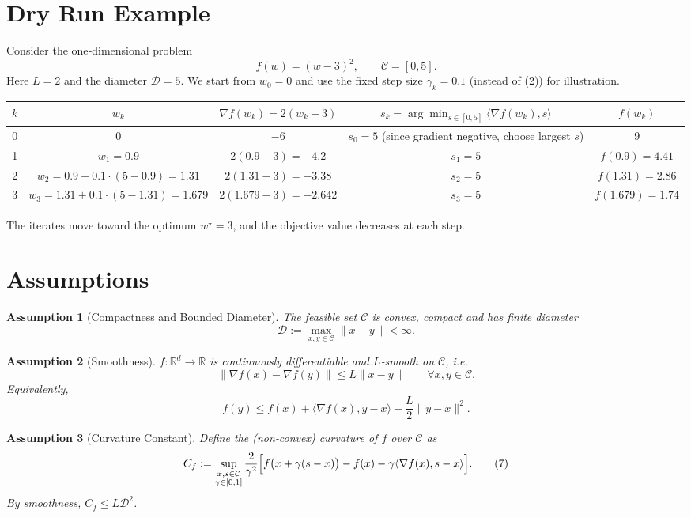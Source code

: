 \documentclass{article}
\newtheorem{assumption}{Assumption}
\newcommand{\diam}{\mathcal{D}}
\newcommand{\curv}{C_f}
\begin{document}
\section*{Dry Run Example}
Consider the one‑dimensional problem
\[
f(w) = (w-3)^2 ,\qquad \mathcal C = [0,5].
\]
Here $L=2$ and the diameter $\diam =5$.  
We start from $w_0=0$ and use the fixed step size $\gamma_k=0.1$ (instead of (2))
for illustration.

\begin{center}
\begin{tabular}{c|c|c|c|c}
$k$ & $w_k$ & $\nabla f(w_k)=2(w_k-3)$ & $s_k=\arg\min_{s\in[0,5]}\langle\nabla f(w_k),s\rangle$ & $f(w_k)$\\\hline
0 & $0$ & $-6$ & $s_0=5$ (since gradient negative, choose largest $s$) & $9$\\
1 & $w_1=0.9$ & $2(0.9-3)=-4.2$ & $s_1=5$ & $f(0.9)=4.41$\\
2 & $w_2=0.9+0.1\cdot(5-0.9)=1.31$ & $2(1.31-3)=-3.38$ & $s_2=5$ & $f(1.31)=2.86$\\
3 & $w_3=1.31+0.1\cdot(5-1.31)=1.679$ & $2(1.679-3)=-2.642$ & $s_3=5$ & $f(1.679)=1.74$
\end{tabular}
\end{center}
The iterates move toward the optimum $w^\star=3$, and the objective value
decreases at each step.

\section*{Assumptions}
\begin{assumption}[Compactness and Bounded Diameter]\label{as:diam}
The feasible set $\mathcal C$ is convex, compact and has finite diameter
\[
\diam := \max_{x,y\in\mathcal C}\|x-y\| < \infty .
\]
\end{assumption}

\begin{assumption}[Smoothness]\label{as:smooth}
$f:\mathbb R^{d}\to\mathbb R$ is continuously differentiable and $L$‑smooth on
$\mathcal C$, i.e.
\[
\|\nabla f(x)-\nabla f(y)\|\le L\|x-y\|\qquad\forall x,y\in\mathcal C .
\tag{5}
\]
Equivalently,
\[
f(y)\le f(x)+\langle\nabla f(x),y-x\rangle+\frac{L}{2}\|y-x\|^{2}.
\tag{6}
\]
\end{assumption}

\begin{assumption}[Curvature Constant]\label{as:curv}
Define the (non‑convex) curvature of $f$ over $\mathcal C$ as
\[
\curv := \sup_{\substack{x,s\in\mathcal C\\\gamma\in[0,1]}}
\frac{2}{\gamma^{2}}
\Bigl[f\bigl(x+\gamma(s-x)\bigr)-f(x)-\gamma\langle\nabla f(x),s-x\rangle\Bigr].
\tag{7}
\]
By smoothness, $\curv\le L\diam^{2}$.
\end{assumption}
\end{document}
